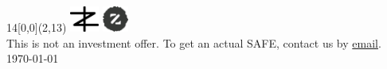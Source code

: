 \documentclass{deck}
\begin{document}
\setlength{\parindent}{0pt} %

\setlength{\fboxsep}{2pt}
\newcommand\point[2]{\vbox{\raggedright\small%
  \fcolorbox{zgreen}{white}{\color{zgreen}#1}\newline%
  \footnotesize#2\vspace{16pt}}}
\newcommand\highlight[1]{{\color{white}{\hl{\thinspace#1\thinspace}}}}

\begin{textblock}{14}[0,0](2,13){
  \color{gray}\footnotesize
  \includegraphics[height=24pt]{../images/zerocracy-logo.pdf}
  \includegraphics[height=24pt]{../images/logo.pdf}\\
  This is not an investment offer. To get an actual SAFE,
  contact us by \href{mailto:cio@zerocracy.com}{email}.\\
  \today\quad\zoldversion
}\end{textblock}
\end{document}
